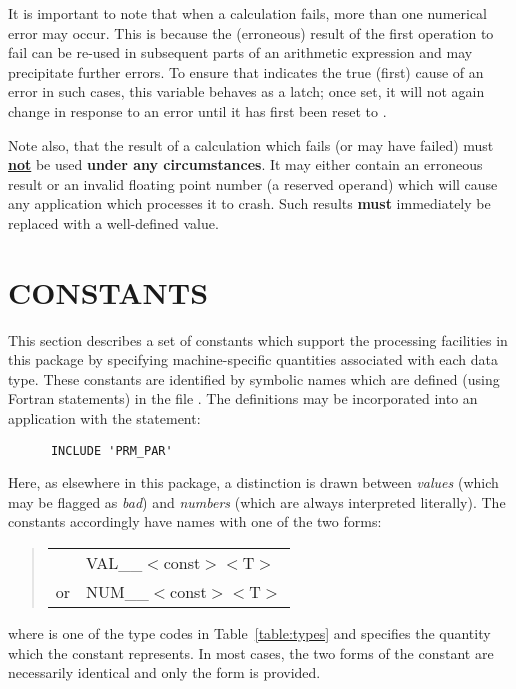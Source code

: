 It is important to note that when a calculation fails, more than
one numerical error may occur.
This is because the (erroneous) result of the first operation to fail can be
re-used in subsequent parts of an arithmetic expression and may precipitate
further errors. 
To ensure that  indicates the true (first) cause of an error
in such cases, this variable behaves as a latch; once set, it will not again
change in response to an error until it has first been reset to
. 

Note also, that the result of a calculation which fails (or may have 
failed) must {\bf \underline{not}} be used {\bf under any circumstances}. 
It may either contain an erroneous result or an invalid floating point
number (a reserved operand) which will cause any application which processes
it to crash. 
Such results {\bf must} immediately be replaced with a well-defined value.

\section{CONSTANTS}

\label{section:constants}

This section describes a set of constants which support the processing
facilities in this package by specifying machine-specific quantities
associated with each data type. 
These constants are identified by symbolic names which are defined (using
Fortran  statements) in the file . 
The definitions may be incorporated into an application with the statement: 

\begin{verbatim}
      INCLUDE 'PRM_PAR'
\end{verbatim}

Here, as elsewhere in this package, a distinction is drawn between {\em 
values} (which may be flagged as {\em bad}) and {\em numbers} (which are
always interpreted literally). 
The constants accordingly have names with one of the two forms:

\begin{quote}
\begin{tabular}{rl}
& VAL\_\_$<$const$><$T$>$\\
or & NUM\_\_$<$const$><$T$>$
\end{tabular}
\end{quote}

where  is one of the type codes in Table~\ref{table:types} and
 specifies the quantity which the constant represents. 
In most cases, the two forms of the constant are necessarily identical and
only the  form is provided. 

